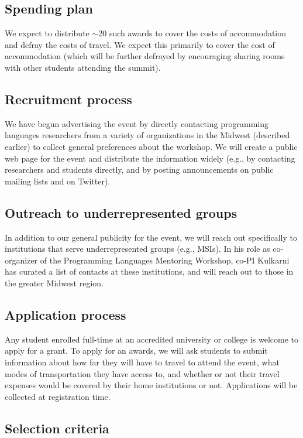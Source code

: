 \documentclass[11pt]{article}
\begin{document}
\subsection{Spending plan}

We expect to distribute $\sim$20 such awards to cover the costs of accommodation and defray the costs of travel. We expect this primarily to cover the cost of accommodation (which will be further defrayed by encouraging sharing rooms with other students attending the summit).

\subsection{Recruitment process}

We have begun advertising the event by directly contacting programming
languages researchers from a variety of organizations in the Midwest
(described earlier) to collect general preferences about the workshop. We will create a public web page for the event and distribute the information widely
(e.g., by contacting researchers and students directly, and by posting
announcements on public mailing lists and on Twitter).

\subsection{Outreach to underrepresented groups}

In addition to our general publicity for the event, we will reach out specifically to institutions that serve underrepresented groups (e.g., MSIs). In his role as co-organizer of the Programming Languages Mentoring Workshop, co-PI Kulkarni has curated a list of contacts at these institutions, and will reach out to those in the greater Midwest region.

\subsection{Application process}

Any student enrolled full-time at an accredited
university or college is welcome to apply for a grant.
To apply for an awards, we will ask students
to submit information about how far they will have to travel to attend
the event, what modes of transportation they have access to, and
whether or not their travel expenses would be covered by their home
institutions or not. Applications will be collected at registration time. 

\subsection{Selection criteria}
\end{document}
